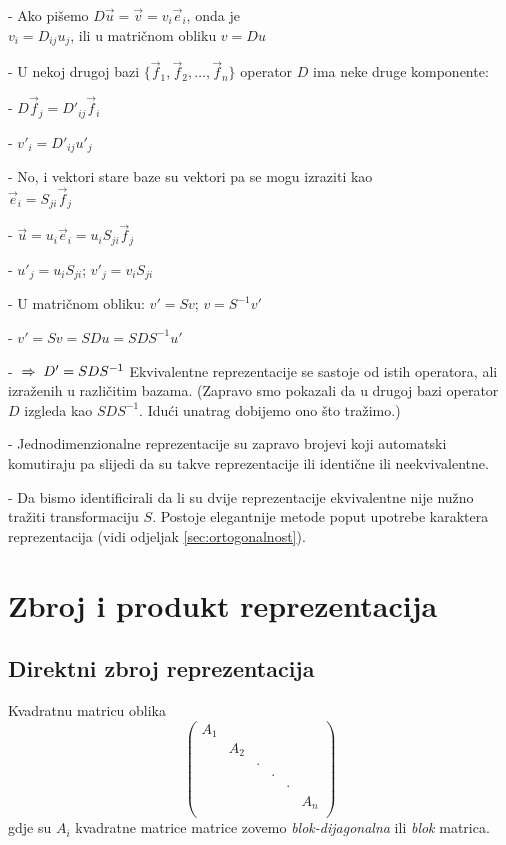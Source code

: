 - Ako pišemo $D\vec{u}=\vec{v}=v_i \vec{e}_i$, onda je\\
   $v_i = D_{ij} u_j$, ili u matričnom obliku $v=Du$

- U nekoj drugoj bazi $\{\vec{f}_1, \vec{f}_2, \ldots, \vec{f}_n\}$
  operator $D$ ima neke druge komponente:

- $D \vec{f}_j = D'_{ij} \vec{f}_i$

- $v'_i = D'_{ij} u'_j$

- No, i vektori stare baze su vektori pa se mogu izraziti kao\\
  $\vec{e}_i = S_{ji} \vec{f}_j$

- $\vec{u}=u_i \vec{e}_i = u_i S_{ji} \vec{f}_j$

- $u'_j = u_i S_{ji}$; $v'_j = v_i S_{ji}$

- U matričnom obliku: $v'=Sv$; $v=S^{-1}v'$

- $v'=Sv=SDu=SDS^{-1}u'$

- $\;\Rightarrow\; D'=SDS^{-1}$ Ekvivalentne reprezentacije se sastoje od istih 
  operatora, ali izraženih u različitim bazama. (Zapravo smo pokazali
da u drugoj bazi operator $D$ izgleda kao $S D S^{-1}$. Idući unatrag
dobijemo ono što tražimo.)

- Jednodimenzionalne reprezentacije su zapravo brojevi koji automatski
  komutiraju pa slijedi da su takve reprezentacije ili identične ili
  neekvivalentne.

- Da bismo identificirali da li su dvije reprezentacije ekvivalentne
  nije nužno tražiti transformaciju $S$. Postoje elegantnije metode
  poput upotrebe karaktera reprezentacija (vidi odjeljak \ref{sec:ortogonalnost}).

\section{Zbroj i produkt reprezentacija}

\subsection*{Direktni zbroj reprezentacija}

Kvadratnu matricu oblika
\begin{displaymath}
   \left(
   \begin{array}{cccccc}
        A_1 & & & & & \\
        & A_2 & & & &  \\
        & & \cdot & & & \\
        & & &  \cdot  & & \\
        & & & &  \cdot   & \\
        & & & &  & A_n  \\
\end{array}
   \right)
\end{displaymath}
gdje su $A_i$ kvadratne matrice matrice
zovemo \emph{blok-dijagonalna} ili \emph{blok} matrica.

